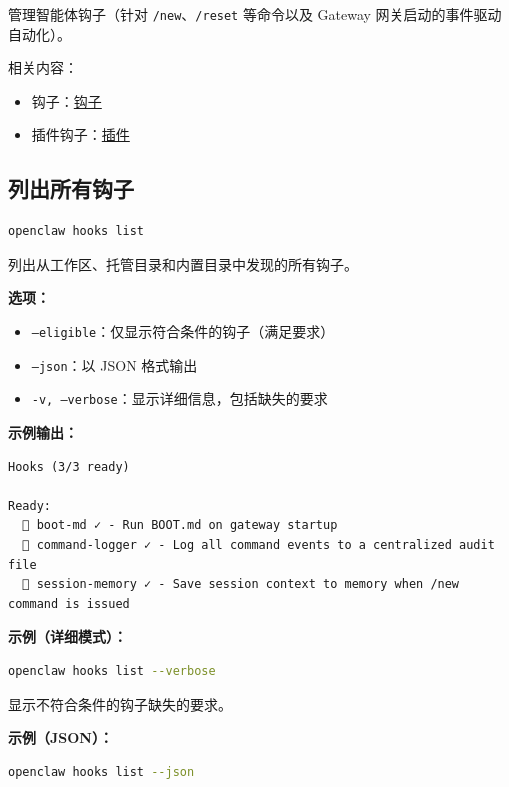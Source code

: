 管理智能体钩子（针对 \texttt{/new}、\texttt{/reset} 等命令以及 Gateway 网关启动的事件驱动自动化）。

相关内容：

\begin{itemize}
  \item 钩子：\href{/automation/hooks}{钩子}
  \item 插件钩子：\href{/tools/plugin\#plugin-hooks}{插件}
\end{itemize}


\subsection{列出所有钩子}


\begin{lstlisting}[language=bash]
openclaw hooks list
\end{lstlisting}


列出从工作区、托管目录和内置目录中发现的所有钩子。

\textbf{选项：}

\begin{itemize}
  \item \texttt{--eligible}：仅显示符合条件的钩子（满足要求）
  \item \texttt{--json}：以 JSON 格式输出
  \item \texttt{-v, --verbose}：显示详细信息，包括缺失的要求
\end{itemize}


\textbf{示例输出：}

\begin{lstlisting}
Hooks (3/3 ready)

Ready:
  🚀 boot-md ✓ - Run BOOT.md on gateway startup
  📝 command-logger ✓ - Log all command events to a centralized audit file
  💾 session-memory ✓ - Save session context to memory when /new command is issued
\end{lstlisting}


\textbf{示例（详细模式）：}

\begin{lstlisting}[language=bash]
openclaw hooks list --verbose
\end{lstlisting}


显示不符合条件的钩子缺失的要求。

\textbf{示例（JSON）：}

\begin{lstlisting}[language=bash]
openclaw hooks list --json
\end{lstlisting}


